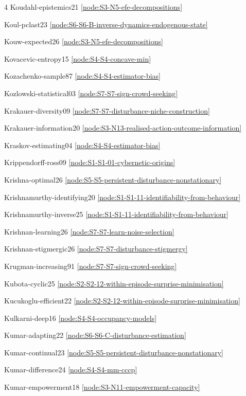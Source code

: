 \documentclass[10pt]{article}
\begin{document}
{\begin{multicols}{4}
Koudahl-epistemics21 \hfill \ref{node:S3-N5-efe-decompositions}\par
Koul-pclast23 \hfill \ref{node:S6-S6-B-inverse-dynamics-endogenous-state}\par
Kouw-expected26 \hfill \ref{node:S3-N5-efe-decompositions}\par
Kovacevic-entropy15 \hfill \ref{node:S4-S4-concave-min}\par
Kozachenko-sample87 \hfill \ref{node:S4-S4-estimator-bias}\par
Kozlowski-statistical03 \hfill \ref{node:S7-S7-sign-crowd-seeking}\par
Krakauer-diversity09 \hfill \ref{node:S7-S7-disturbance-niche-construction}\par
Krakauer-information20 \hfill \ref{node:S3-N13-realised-action-outcome-information}\par
Kraskov-estimating04 \hfill \ref{node:S4-S4-estimator-bias}\par
Krippendorff-ross09 \hfill \ref{node:S1-S1-01-cybernetic-origins}\par
Krishna-optimal26 \hfill \ref{node:S5-S5-persistent-disturbance-nonstationary}\par
Krishnamurthy-identifying20 \hfill \ref{node:S1-S1-11-identifiability-from-behaviour}\par
Krishnamurthy-inverse25 \hfill \ref{node:S1-S1-11-identifiability-from-behaviour}\par
Krishnan-learning26 \hfill \ref{node:S7-S7-learn-noise-selection}\par
Krishnan-stigmergic26 \hfill \ref{node:S7-S7-disturbance-stigmergy}\par
Krugman-increasing91 \hfill \ref{node:S7-S7-sign-crowd-seeking}\par
Kubota-cyclic25 \hfill \ref{node:S2-S2-12-within-episode-surprise-minimisation}\par
Kucukoglu-efficient22 \hfill \ref{node:S2-S2-12-within-episode-surprise-minimisation}\par
Kulkarni-deep16 \hfill \ref{node:S4-S4-occupancy-models}\par
Kumar-adapting22 \hfill \ref{node:S6-S6-C-disturbance-estimation}\par
Kumar-continual23 \hfill \ref{node:S5-S5-persistent-disturbance-nonstationary}\par
Kumar-difference24 \hfill \ref{node:S4-S4-mm-cccp}\par
Kumar-empowerment18 \hfill \ref{node:S3-N11-empowerment-capacity}\par

\end{multicols}}
\end{document}
